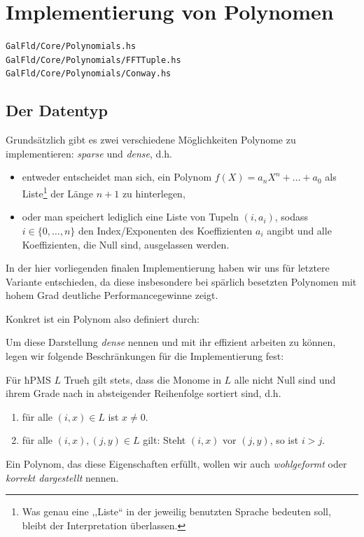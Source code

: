 \section{Implementierung von Polynomen}
\label{sec:polynomials}
\texttt{GalFld/Core/Polynomials.hs}\\
\texttt{GalFld/Core/Polynomials/FFTTuple.hs}\\
\texttt{GalFld/Core/Polynomials/Conway.hs}\\

\subsection{Der Datentyp}

Grundsätzlich gibt es zwei verschiedene Möglichkeiten Polynome zu
implementieren: \emph{sparse} und \emph{dense}, d.h. 
\begin{itemize}
  \item entweder entscheidet man
    sich, ein Polynom $f(X) = a_nX^n + \ldots + a_0$ als Liste\footnote{Was genau 
    eine ,,Liste`` in der jeweilig benutzten Sprache bedeuten soll, bleibt der
    Interpretation überlassen.} der Länge $n+1$ zu hinterlegen,
  \item oder man speichert lediglich eine Liste von Tupeln $(i,a_i)$, sodass
    $i \in \{0,\ldots,n\}$ den Index/Exponenten des Koeffizienten $a_i$ angibt
    und alle Koeffizienten, die Null sind, ausgelassen werden.
\end{itemize}
In der hier vorliegenden finalen Implementierung haben wir uns für letztere
Variante entschieden, da diese insbesondere bei spärlich besetzten Polynomen
mit hohem Grad deutliche Performancegewinne zeigt.

Konkret ist ein Polynom also definiert durch:

Um diese Darstellung \emph{dense} nennen und mit ihr effizient arbeiten zu 
können, legen wir folgende Beschränkungen für die Implementierung fest:
\begin{invariante}
  \label{inv:poly}
  Für ħPMS $L$ Trueħ gilt stets, dass die Monome in $L$ alle nicht Null 
  sind und ihrem Grade nach in
  absteigender Reihenfolge sortiert sind, d.h.
  \begin{enumerate}
    \item für alle $(i,x) \in L$ ist $x \neq 0$.
    \item für alle $(i,x), (j,y) \in L$ gilt: Steht $(i,x)$ vor $(j,y)$, so ist
      $i > j$.
  \end{enumerate}
  Ein Polynom, das diese Eigenschaften erfüllt, wollen wir auch 
  \emph{wohlgeformt} oder \emph{korrekt dargestellt} nennen.
\end{invariante}

